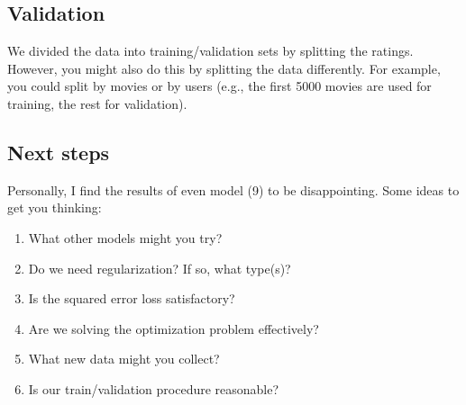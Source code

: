 \documentclass{article}
\begin{document}

\subsection{Validation}

We divided the data into training/validation sets by splitting the ratings.
However, you might also do this by splitting the data differently. For example,
you could split by movies or by users (e.g., the first 5000 movies are used for training, the rest for validation). 


\subsection{Next steps}

Personally, I find the results of even model (9) to be disappointing.
 Some ideas to get you thinking:
\begin{enumerate}
\item What other models might you try? 
\item Do we need regularization? If so, what type(s)?
\item Is the squared error loss satisfactory?
\item Are we solving the optimization problem effectively?
\item What new data might you collect? 
\item Is our train/validation procedure reasonable?
\end{enumerate}
\end{document}
